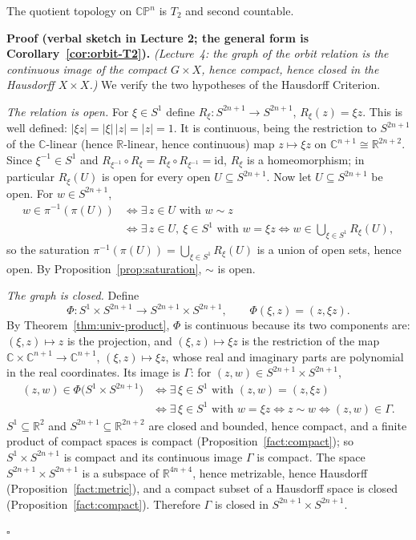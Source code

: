 \documentclass[11pt]{report}
\makeatletter
\newcounter{thmcounter}[section]
\renewenvironment{proof}[1][Proof]{\noindent\textbf{#1.} }{\hfill$\square$\par\vspace{5pt}}
\newcommand{\thmlabel}[1]{\edef\@currentlabel{\arabic{section}.\arabic{thmcounter}}\label{#1}}
\newcommand{\leeref}[1]{\par\smallskip{\raggedleft\footnotesize\textsc{Lee}:\ #1\par}}
\makeatother
\begin{document}
\begin{propbox}\thmlabel{prop:cpn}
The quotient topology on $\mathbb{CP}^n$ is $T_2$ and second countable.
\leeref{Problem 1-9}
\end{propbox}

\begin{proof}[Proof (verbal sketch in Lecture 2; the general form is Corollary~\ref{cor:orbit-T2})]
\textit{(Lecture~4: the graph of the orbit relation is the continuous image of the compact $G \times X$, hence compact, hence closed in the Hausdorff $X \times X$.)} We verify the two hypotheses of the Hausdorff Criterion.

\emph{The relation is open.} For $\xi \in S^1$ define $R_\xi : S^{2n+1} \to S^{2n+1}$, $R_\xi(z) = \xi z$. This is well defined: $|\xi z| = |\xi|\,|z| = |z| = 1$. It is continuous, being the restriction to $S^{2n+1}$ of the $\mathbb{C}$-linear (hence $\mathbb{R}$-linear, hence continuous) map $z \mapsto \xi z$ on $\mathbb{C}^{n+1} \cong \mathbb{R}^{2n+2}$. Since $\xi^{-1} \in S^1$ and $R_{\xi^{-1}} \circ R_\xi = R_\xi \circ R_{\xi^{-1}} = \mathrm{id}$, $R_\xi$ is a homeomorphism; in particular $R_\xi(U)$ is open for every open $U \subseteq S^{2n+1}$. Now let $U \subseteq S^{2n+1}$ be open. For $w \in S^{2n+1}$,
\begin{align*}
w \in \pi^{-1}(\pi(U)) &\iff \exists\, z \in U \text{ with } w \sim z \\
&\iff \exists\, z \in U,\ \xi \in S^1 \text{ with } w = \xi z \iff w \in \bigcup_{\xi \in S^1} R_\xi(U),
\end{align*}
so the saturation $\pi^{-1}(\pi(U)) = \bigcup_{\xi \in S^1} R_\xi(U)$ is a union of open sets, hence open. By Proposition~\ref{prop:saturation}, $\sim$ is open.

\emph{The graph is closed.} Define
\[
\Phi : S^1 \times S^{2n+1} \longrightarrow S^{2n+1} \times S^{2n+1}, \qquad \Phi(\xi, z) = (z, \xi z).
\]
By Theorem~\ref{thm:univ-product}, $\Phi$ is continuous because its two components are: $(\xi, z) \mapsto z$ is the projection, and $(\xi, z) \mapsto \xi z$ is the restriction of the map $\mathbb{C} \times \mathbb{C}^{n+1} \to \mathbb{C}^{n+1}$, $(\xi, z) \mapsto \xi z$, whose real and imaginary parts are polynomial in the real coordinates. Its image is $\Gamma$: for $(z, w) \in S^{2n+1} \times S^{2n+1}$,
\begin{align*}
(z, w) \in \Phi\big(S^1 \times S^{2n+1}\big) &\iff \exists\, \xi \in S^1 \text{ with } (z, w) = (z, \xi z) \\
&\iff \exists\, \xi \in S^1 \text{ with } w = \xi z \iff z \sim w \iff (z,w) \in \Gamma.
\end{align*}
$S^1 \subseteq \mathbb{R}^2$ and $S^{2n+1} \subseteq \mathbb{R}^{2n+2}$ are closed and bounded, hence compact, and a finite product of compact spaces is compact (Proposition~\ref{fact:compact}); so $S^1 \times S^{2n+1}$ is compact and its continuous image $\Gamma$ is compact. The space $S^{2n+1} \times S^{2n+1}$ is a subspace of $\mathbb{R}^{4n+4}$, hence metrizable, hence Hausdorff (Proposition~\ref{fact:metric}), and a compact subset of a Hausdorff space is closed (Proposition~\ref{fact:compact}). Therefore $\Gamma$ is closed in $S^{2n+1} \times S^{2n+1}$.


\end{proof}
\end{document}
